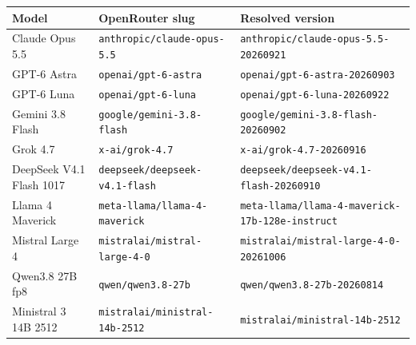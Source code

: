 \begin{tabular}{lll}
  \toprule
  Model & OpenRouter slug & Resolved version \\
  \midrule
  Claude Opus 5.5 & \texttt{anthropic/claude-opus-5.5} & \texttt{anthropic/claude-opus-5.5-20260921} \\
  GPT-6 Astra & \texttt{openai/gpt-6-astra} & \texttt{openai/gpt-6-astra-20260903} \\
  GPT-6 Luna & \texttt{openai/gpt-6-luna} & \texttt{openai/gpt-6-luna-20260922} \\
  Gemini 3.8 Flash & \texttt{google/gemini-3.8-flash} & \texttt{google/gemini-3.8-flash-20260902} \\
  Grok 4.7 & \texttt{x-ai/grok-4.7} & \texttt{x-ai/grok-4.7-20260916} \\
  DeepSeek V4.1 Flash 1017 & \texttt{deepseek/deepseek-v4.1-flash} & \texttt{deepseek/deepseek-v4.1-flash-20260910} \\
  Llama 4 Maverick & \texttt{meta-llama/llama-4-maverick} & \texttt{meta-llama/llama-4-maverick-17b-128e-instruct} \\
  Mistral Large 4 & \texttt{mistralai/mistral-large-4-0} & \texttt{mistralai/mistral-large-4-0-20261006} \\
  Qwen3.8 27B fp8 & \texttt{qwen/qwen3.8-27b} & \texttt{qwen/qwen3.8-27b-20260814} \\
  Ministral 3 14B 2512 & \texttt{mistralai/ministral-14b-2512} & \texttt{mistralai/ministral-14b-2512} \\
  \bottomrule
\end{tabular}
